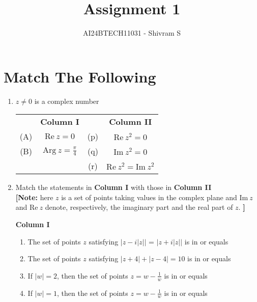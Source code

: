 \documentclass[journal,12pt,twocolumn]{IEEEtran}
\theoremstyle{remark}
\newcommand{\RE}{\mathrm{Re}}
\newcommand{\IM}{\mathrm{Im}}
\begin{document}

\vspace{3cm}

\title{Assignment 1}
\author{AI24BTECH11031 - Shivram S}
\maketitle
\newpage
\bigskip

\renewcommand{\thefigure}{\theenumi}
\renewcommand{\thetable}{\theenumi}
\section*{Match The Following}

\begin{enumerate}[label=\arabic*)]
	\item $z \ne 0$ is a complex number
		\hspace*{\fill} {\color{magenta}}

		\begin{tabular}{ c c c c }
			& \textbf{Column I}						&		& \textbf{Column II}		\\
			(A) & $\RE\ z = 0$						& (p)	& $\RE\ z^2  = 0$			\\
			(B) & $\mathrm{Arg}\ z = \frac\pi4$		& (q)	& $\IM\ z^2  = 0$	\\
			&										& (r)	& $\RE\ z^2  = \IM\ z^2$
		\end{tabular}

		\vspace{5mm}

	\item Match the statements in \textbf{Column I} with those in \textbf{Column II}
		\hspace*{\fill} {\color{magenta}} \\
		\textbf{[Note:} here $z$ is a set of points taking values in the complex plane and $\IM\ z$ and $\RE\ z$
		denote, respectively, the imaginary part and the real part of $z$. \textbf{]}

		\vspace{5mm}

		\textbf{Column I}
		\begin{enumerate}[label=(\Alph*)]
			\item The set of points $z$ satisfying $|z - i|z||$ = $|z + i|z||$ is in or equals
			\item The set of points $z$ satisfying $|z + 4| + |z - 4| = 10$ is in or equals
			\item If $|w| = 2$, then the set of points $z = w - \frac 1 w$ is in or equals
			\item If $|w| = 1$, then the set of points $z = w - \frac 1 w$ is in or equals
		\end{enumerate}


\end{enumerate}
\end{document}

